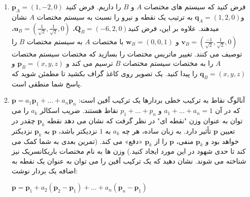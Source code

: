 {\begin{spacing}{1.5}
\begin{enumerate}[label=\textbf{\arabic*}.]
            \item {فرض کنید که سیستم های مختصات $A$ و $B$ را داریم.
            فرض کنید $\textbf{p}_{A}=(1,-2,0)$ و$\textbf{q}_{A}=(1,2,0)$ به ترتیب یک نقطه و نیرو را نسبت به سیستم مختصات $A$ نشان میدهند.
            علاوه بر این، فرض کنید$\textbf{Q}_{B}=(-6,2,0)$، $\textbf{u}_{B}=\left(\frac{\displaystyle 1}{\sqrt{\displaystyle 2}},\frac{\displaystyle 1}{\sqrt{\displaystyle 2}},0 \right)$، $\textbf{v}_{B}=\left(\frac{\displaystyle -1}{\sqrt{\displaystyle 2}},\frac{\displaystyle 1}{\sqrt{\displaystyle 2}},0 \right)$ و $\textbf{w}_{B}=(0,0,1)$ با مختصات $A$ به سیستم مختصات $B$ را توصیف می کنند.
            تغییر ماتریس مختصات را بسازید که مختصات سیستم مختصات $A$ را به مختصات سیستم مختصات $B$ ترسیم می کند و $\textbf{p}_{B}=(x,y,z)$ و $\textbf{q}_{B}=(x,y,z)$ را پیدا کنید.
            یک تصویر روی کاغذ گراف بکشید تا مطمئن شوید که پاسخ شما منطقی است.}

            \item {
                آنالوگ نقاط به ترکیب خطی بردارها یک ترکیب آفین است:
                $\textbf{p}=a_{1}\textbf{p}_{1}+\dots+a_{n}\textbf{p}_{n}$ که در آن $a_{1}+\dots+a_{n}=1$ و $p_{1}+\dots+p_{n}$ نقاط هستند.
                ضریب اسکالر $a_{k}$ را می توان به عنوان وزن "نقطه ای" در نظر گرفت
                که نشان می دهد نقطه $\textbf{p}_{k}$ چقدر در تعیین $\textbf{p}$ تأثیر دارد.
                به زبان ساده، هر چه $a_{k}$ به $1$ نزدیکتر باشد،
                $\textbf{p}$ به $\textbf{p}_{k}$ نزدیکتر خواهد بود و $\textbf{p}_{k}$ منفی، $\textbf{p}$ را از $\textbf{p}_{k}$ «دفع» می کند.
                (تمرین بعدی به شما کمک می کند تا حدی شهود در این مورد ایجاد کنید.) وزن ها به نام مختصات باریکانسریک نیز شناخته می شوند.
                نشان دهید که یک ترکیب آفین را می توان به عنوان یک نقطه به اضافه یک بردار نوشت:
                \begin{center}
                    $\textbf{p}=\textbf{p}_{1}+a_{2}(\textbf{p}_{2}-\textbf{p}_{1})+\dots+a_{n}(\textbf{p}_{n}-\textbf{p}_{1})$
                \end{center}
            }


\end{enumerate}
\end{spacing}}
